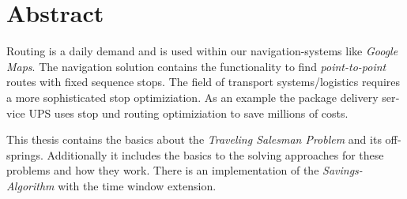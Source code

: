 \chapter{Abstract}

\begin{english} %
Routing is a daily demand and is used within our navigation-systems like \textit{Google Maps}. 
The navigation solution contains the functionality to find \textit{point-to-point} routes with fixed sequence stops. 
The field of transport systems/logistics requires a more sophisticated stop optimiziation. 
As an example the package delivery service UPS uses stop und routing optimiziation to save millions of costs. 

\noindent
This thesis contains the basics about the \textit{Traveling Salesman Problem} and its offsprings. 
Additionally it includes the basics to the solving approaches for these problems and how they work. 
There is an implementation of the \textit{Savings-Algorithm} with the time window extension. 
\end{english}